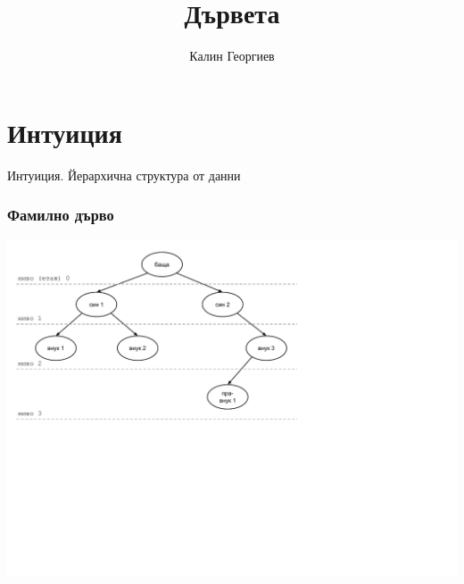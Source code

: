\documentclass{beamer}
\begin{document}
\title[Структури от данни и програмиране]{Дървета}
\author{Калин Георгиев}
\frame{\titlepage}

\section{Интуиция}


\begin{frame}
\centerline{Интуиция. Йерархична структура от данни}
\end{frame}


\begin{frame}[fragile]
\frametitle{Фамилно дърво}

\includegraphics[width=17cm]{images/tree_family_tree}

\end{frame}
\end{document}
